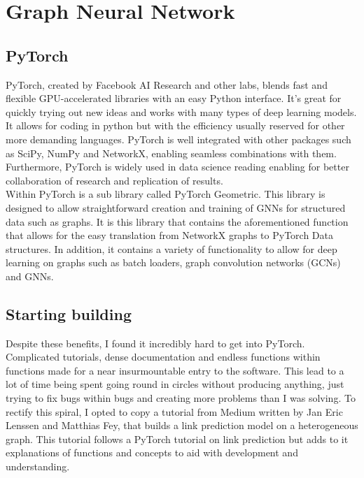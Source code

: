 \documentclass{l4proj}
\begin{document}
\section{Graph Neural Network}

\subsection{PyTorch}

PyTorch, created by Facebook AI Research and other labs, blends fast and flexible GPU-accelerated libraries with an easy Python interface. It's great for quickly trying out new ideas and works with many types of deep learning models. It allows for coding in python but with the efficiency usually reserved for other more demanding languages. PyTorch is well integrated with other packages such as SciPy, NumPy and NetworkX, enabling seamless combinations with them. Furthermore, PyTorch is widely used in data science reading enabling for better collaboration of research and replication of results. \\

Within PyTorch is a sub library called PyTorch Geometric. This library is designed to allow straightforward creation and training of GNNs for structured data such as graphs. It is this library that contains the aforementioned function that allows for the easy translation from NetworkX graphs to PyTorch Data structures. In addition, it contains a variety of functionality to allow for deep learning on graphs such as batch loaders, graph convolution networks (GCNs) and GNNs. \\

\subsection{Starting building}

Despite these benefits, I found it incredibly hard to get into PyTorch. Complicated tutorials, dense documentation and endless functions within functions made for a near insurmountable entry to the software. This lead to a lot of time being spent going round in circles without producing anything, just trying to fix bugs within bugs and creating more problems than I was solving. To rectify this spiral, I opted to copy a tutorial from Medium written by Jan Eric Lenssen and Matthias Fey, that builds a link prediction model on a heterogeneous graph. This tutorial follows a PyTorch tutorial on link prediction but adds to it explanations of functions and concepts to aid with development and understanding. \\
\end{document}
